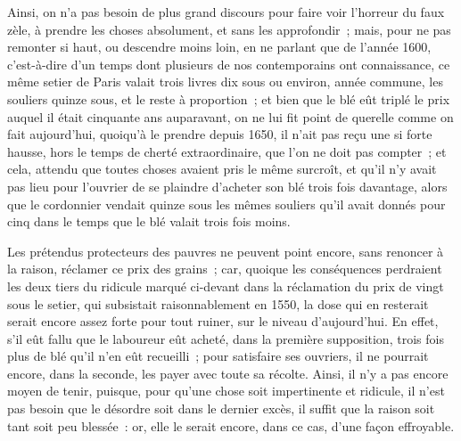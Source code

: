\documentclass[french,twoside]{book} %
\begin{document}
Ainsi, on n’a pas besoin de plus grand discours pour faire voir l’horreur du faux zèle, à prendre les choses absolument, et sans les approfondir ; mais, pour ne pas remonter si haut, ou descendre moins loin, en ne parlant que de l’année 1600, c’est-à-dire d’un temps dont plusieurs de nos contemporains ont connaissance, ce même setier de Paris valait trois livres dix sous ou environ, année commune, les souliers quinze sous, et le reste à proportion ; et bien que le blé eût triplé le prix auquel il était cinquante ans auparavant, on ne lui fit point de querelle comme on fait aujourd’hui, quoiqu’à le prendre depuis 1650, il n’ait pas reçu une si forte hausse, hors le temps de cherté extraordinaire, que l’on ne doit pas compter ; et cela, attendu que toutes choses avaient pris le même surcroît, et qu’il n’y avait pas lieu pour l’ouvrier de se plaindre d’acheter son blé trois fois davantage, alors que le cordonnier vendait quinze sous les mêmes souliers qu’il avait donnés pour cinq dans le temps que le blé valait trois fois moins.\par
Les prétendus protecteurs des pauvres ne peuvent point encore, sans renoncer à la raison, réclamer ce prix des grains ; car, quoique les conséquences perdraient les deux tiers du ridicule marqué ci-devant dans la réclamation du prix de vingt sous le setier, qui subsistait raisonnablement en 1550, la dose qui en resterait serait encore assez forte pour tout ruiner, sur le niveau d’aujourd’hui. En effet, s’il eût fallu que le laboureur eût acheté, dans la première supposition, trois fois plus de blé qu’il n’en eût recueilli ; pour satisfaire ses ouvriers, il ne pourrait encore, dans la seconde, les payer avec toute sa récolte. Ainsi, il n’y a pas encore moyen de tenir, puisque, pour qu’une chose soit impertinente et ridicule, il n’est pas besoin que le désordre soit dans le dernier excès, il suffit que la raison soit tant soit peu blessée : or, elle le serait encore, dans ce cas, d’une façon effroyable.\par
\end{document}
